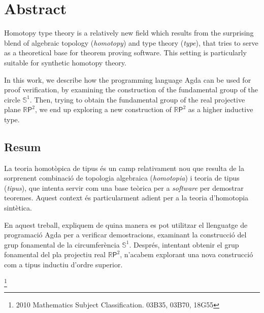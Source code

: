 \section*{Abstract}

Homotopy type theory is a relatively new field which results from the surprising blend of algebraic topology (\textit{homotopy}) and type theory (\textit{type}), that tries to serve as a theoretical base for theorem proving software.
This setting is particularly suitable for synthetic homotopy theory.

In this work, we describe how the programming language Agda can be used for proof verification, by examining the construction of the fundamental group of the circle $\mathbb{S}^{1}$.
Then, trying to obtain the fundamental group of the real projective plane $\mathbb{R}\mathsf{P}^2$, we end up exploring a new construction of $\mathbb{R}\mathsf{P}^2$ as a higher inductive type.

\begin{otherlanguage}{catalan}
\section*{Resum}

La teoria homotòpica de tipus és un camp relativament nou que resulta de la sorprenent combinació de topologia algebraica (\textit{homotopia}) i teoria de tipus (\textit{tipus}), que intenta servir com una base teòrica per a \textit{software} per demostrar teoremes.
Aquest context és particularment adient per a la teoria d'homotopia sintètica.

En aquest treball, expliquem de quina manera es pot utilitzar el llenguatge de programació Agda per a verificar demostracions, examinant la construcció del grup fonamental de la circumferència $\mathbb{S}^{1}$.
Després, intentant obtenir el grup fonamental del pla projectiu real $\mathbb{R}\mathsf{P}^2$, n'acabem explorant una nova construcció com a tipus inductiu d'ordre superior.
\end{otherlanguage}

{\let\thefootnote\relax\footnote{2010 Mathematics Subject Classification. 03B35, 03B70, 18G55}}
